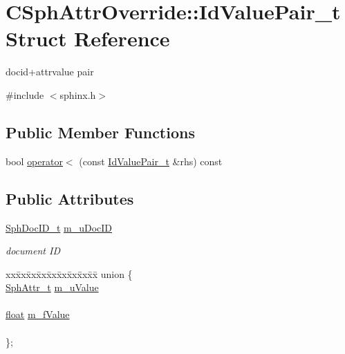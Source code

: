 \hypertarget{structCSphAttrOverride_1_1IdValuePair__t}{\section{C\-Sph\-Attr\-Override\-:\-:Id\-Value\-Pair\-\_\-t Struct Reference}
\label{structCSphAttrOverride_1_1IdValuePair__t}
}


docid+attrvalue pair  




{\ttfamily \#include $<$sphinx.\-h$>$}

\subsection*{Public Member Functions}
\begin{DoxyCompactItemize}
\item 
bool \hyperlink{structCSphAttrOverride_1_1IdValuePair__t_a651fb307fbc03d114cc94883ca944527}{operator$<$} (const \hyperlink{structCSphAttrOverride_1_1IdValuePair__t}{Id\-Value\-Pair\-\_\-t} \&rhs) const 
\end{DoxyCompactItemize}
\subsection*{Public Attributes}
\begin{DoxyCompactItemize}
\item 
\hyperlink{sphinx_8h_a3176771631c12a9e4897272003e6b447}{Sph\-Doc\-I\-D\-\_\-t} \hyperlink{structCSphAttrOverride_1_1IdValuePair__t_a2070eaff526d4adb8fa0fdd569c78c61}{m\-\_\-u\-Doc\-I\-D}
\begin{DoxyCompactList}\small\item\em document I\-D \end{DoxyCompactList}\item 
\begin{tabbing}
xx\=xx\=xx\=xx\=xx\=xx\=xx\=xx\=xx\=\kill
union \{\\
\>\hyperlink{sphinx_8h_a7c122d91b0b52a0214ba176636bb1561}{SphAttr\_t} \hyperlink{structCSphAttrOverride_1_1IdValuePair__t_a580d5a4db4739242dcc2c8bba2c09f8e}{m\_uValue}\\
\>\\
\>\hyperlink{sphinxexpr_8cpp_a0e0d0739f7035f18f949c2db2c6759ec}{float} \hyperlink{structCSphAttrOverride_1_1IdValuePair__t_a38512e623f259143dc1785edbe7783ca}{m\_fValue}\\
\>\\
\}; \\

\end{tabbing}\end{DoxyCompactItemize}


